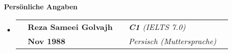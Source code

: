 \documentclass[letterpaper,12pt]{article}[leftmargin=*]
\makeatletter
\def \entryspacing {-0pt}
\renewcommand{\section}[2]{\vspace{5pt}
  \colorbox{secondary}{\color{white}\raggedbottom\normalsize\textbf{{#1}{\hspace{7pt}#2}}}
}
\newcommand{\resumeEntryStart}{\begin{itemize}[leftmargin=2.5mm]}
\newcommand{\resumeEntryEnd}{\end{itemize}\vspace{\entryspacing}}
\newcommand{\aboutMeEntryTSDL}[4]{
  \vspace{-1pt}\item[]
    \begin{tabular*}{0.97\textwidth}{l@{\extracolsep{\fill}}lrlr}
	  \color{primary}{Vor- und Familienname} & \textbf{\color{accent}#1} &
	  \color{primary}{Englisch fließend} & \textit{\color{accent}#3} \\
	  \color{primary}{Geburtsdatum} & \textbf{\color{accent}#2} &
	  \color{primary}{Andere Sprachen} & \textit{\color{accent}#4} \\
    \end{tabular*}\vspace{-6pt}
}
\newcommand{\resumeEntryS}[2]{
  \item[]\small{
    \textbf{\color{primary}#1 }{ #2 \vspace{-6pt}}
  }
}
\makeatother
\begin{document}
	

\section{\faUser}{Persönliche Angaben}
    \resumeEntryStart
      \aboutMeEntryTSDL
	  	{Reza Sameei Golvajh}{Nov 1988}{\textbf{C1} (IELTS 7.0)}{Persisch (Muttersprache)}
    \resumeEntryEnd
  
\end{document}
